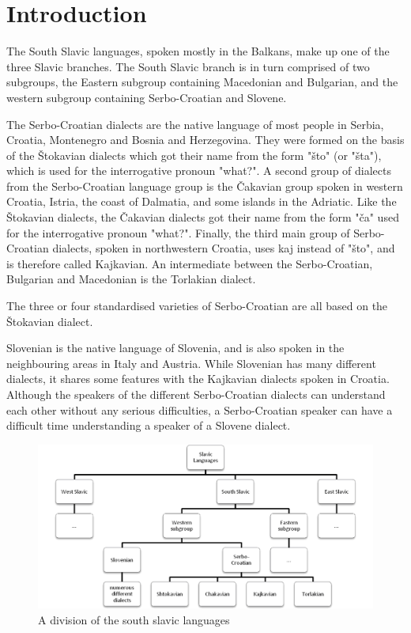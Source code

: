 
\section{Introduction}

The South Slavic languages, spoken mostly in the Balkans, make up one of the three Slavic 
branches. The South Slavic branch is in turn comprised of two subgroups, the Eastern 
subgroup containing Macedonian and Bulgarian, and the western subgroup containing 
Serbo-Croatian and Slovene.

The Serbo-Croatian dialects are the native language of most people in Serbia, Croatia, 
Montenegro and Bosnia and Herzegovina. They were formed on the basis of the Štokavian dialects 
which got their name from the form "što" (or "šta"), which is used for the interrogative pronoun "what?". A second group of dialects from the Serbo-Croatian language group is the Čakavian group spoken in western Croatia, Istria, the coast of Dalmatia, and some islands in the Adriatic. Like the Štokavian dialects, the Čakavian dialects got their name from the form "ča" used for the interrogative pronoun "what?". Finally, the third main group of Serbo-Croatian dialects, spoken in northwestern Croatia, uses kaj instead of "što", and is therefore called Kajkavian.
An intermediate between the Serbo-Croatian, Bulgarian and Macedonian is the Torlakian dialect.

The three or four standardised varieties of Serbo-Croatian are all based on the Štokavian dialect.

Slovenian is the native language of Slovenia, and is also spoken in the neighbouring areas in Italy and Austria. While Slovenian has many different dialects, it shares some features with the Kajkavian dialects spoken in Croatia. Although the speakers of the different Serbo-Croatian dialects can understand each other without any serious difficulties, a Serbo-Croatian speaker can have a difficult time understanding a speaker of a Slovene dialect.

\begin{figure}[ht]
\centering
\includegraphics[scale=0.55]{images/chart.png}
\caption{A division of the south slavic languages}
\end{figure}


\begin{figure}


\end{figure}

